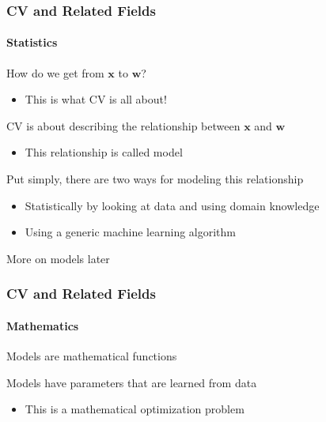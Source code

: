 \documentclass[xetex,professionalfont]{beamer}
\renewcommand{\vec}[1]{\ensuremath{\mathbf{#1}}}
\newcommand{\vw}{\vec{w}}
\newcommand{\vx}{\vec{x}}
\renewcommand\emph[1]{\textcolor{tuwcvl_inf_red}{#1}}
\begin{document}
\begin{frame}
\frametitle{CV and Related Fields}
\framesubtitle{Statistics}

How do we get from $\vx$ to $\vw$?
\begin{itemize}
    \item This is what CV is all about!
\end{itemize}

\bigskip
CV is about describing the relationship between $\vx$ and $\vw$
\begin{itemize}
    \item This relationship is called \emph{model}
\end{itemize}

\bigskip
Put simply, there are two ways for \emph{modeling} this relationship
\begin{itemize}
    \item Statistically by looking at data and using domain knowledge
    \item Using a generic machine learning algorithm
\end{itemize}

\bigskip
More on models later

\end{frame}


\begin{frame}
\frametitle{CV and Related Fields}
\framesubtitle{Mathematics}

Models are mathematical functions

\bigskip
Models have parameters that are \emph{learned} from data
\begin{itemize}
    \item This is a \emph{mathematical optimization} problem
\end{itemize}

\end{frame}

\end{document}
